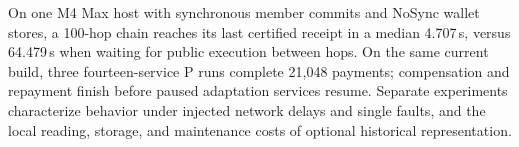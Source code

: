 On one M4 Max host with synchronous member commits and NoSync wallet
stores, a 100-hop chain reaches its last certified receipt in a median
4.707\,s, versus 64.479\,s when waiting for public execution between
hops. On the same current build, three fourteen-service P runs complete
21,048 payments; compensation and repayment finish before paused
adaptation services resume. Separate experiments characterize behavior
under injected network delays and single faults, and the local reading,
storage, and maintenance costs of optional historical representation.
